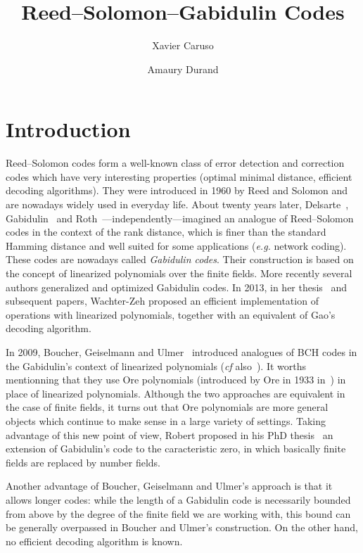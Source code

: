 \documentclass[a4paper]{llncs}
\title{Reed--Solomon--Gabidulin Codes}
\author{Xavier Caruso\inst{1} \and Amaury Durand\inst{2}}
\institute{%
CNRS, Institut Mathématique de Bordeaux, équipe-projet LFANT\
\email{xavier.caruso@normalesup.org}
\and
Université de Franche-Comté\
\email{amaury.durand@edu.univ-fcomte.fr}}
\begin{document}
\maketitle

\section*{Introduction}

Reed--Solomon codes form a well-known class of error detection and 
correction codes which have very interesting properties (optimal minimal 
distance, efficient decoding algorithms). They were introduced in 1960 
by Reed and Solomon and are nowadays widely used in everyday life. About 
twenty years later, Delsarte~\cite{delsarte}, Gabidulin~\cite{gabidulin} 
and Roth~\cite{roth}---independently---imagined an analogue of 
Reed--Solomon codes in the context of the rank distance, which is finer 
than the standard Hamming distance and well suited for some applications 
(\emph{e.g.} network coding). These codes are nowadays called 
\emph{Gabidulin codes}. Their construction is based on the concept of 
linearized polynomials over the finite fields. More recently several 
authors generalized and optimized Gabidulin codes. In 2013, in her 
thesis~\cite{wachter} and subsequent papers, Wachter-Zeh proposed an 
efficient implementation of operations with linearized polynomials, 
together with an equivalent of Gao's decoding algorithm.

In 2009, Boucher, Geiselmann and Ulmer~\cite{bougeiulm} introduced 
analogues of BCH codes in the Gabidulin's context of linearized 
polynomials (\emph{cf} also~\cite{bouulm}). 
It worths mentionning that they use Ore 
polynomials (introduced by Ore in 1933 in~\cite{ore}) in place of 
linearized polynomials. Although the two approaches are equivalent in 
the case of finite fields, it turns out that Ore polynomials are more 
general objects which continue to make sense in a large variety of 
settings.
Taking advantage of this new point of view, Robert proposed in his
PhD thesis~\cite{robert} an extension of Gabidulin's code to the
caracteristic zero, in which basically finite fields are replaced 
by number fields.

Another advantage of Boucher, Geiselmann and Ulmer's approach is that it 
allows longer codes: while the length of a Gabidulin code is necessarily 
bounded from above by the degree of the finite field we are working 
with, this bound can be generally overpassed in Boucher and Ulmer's 
construction. On the other hand, no efficient decoding algorithm is 
known.
\end{document}
